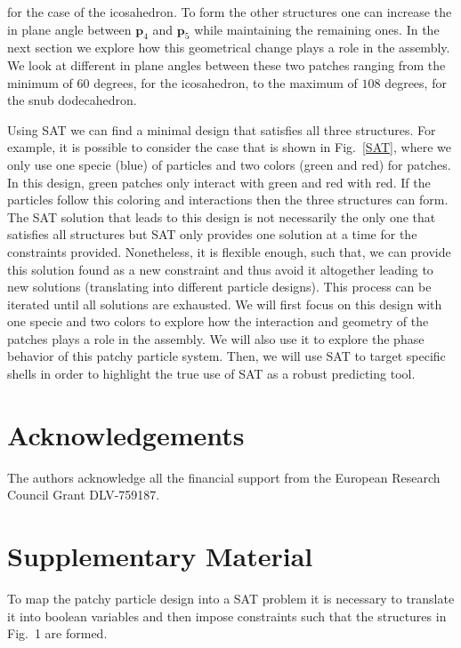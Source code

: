 \documentclass[a4paper, amsfonts, amssymb, amsmath, reprint, showkeys, nofootinbib, oneside]{revtex4-1}
\begin{document}
\noindent for the case of the icosahedron. To form the other structures one can increase the in plane angle between $\textbf{p}_4$ and $\textbf{p}_5$ while maintaining the remaining ones. In the next section we explore how this geometrical change plays a role in the assembly. We look at different in plane angles between these two patches ranging from the minimum of $60$ degrees, for the icosahedron, to the maximum of $108$ degrees, for the snub dodecahedron.

Using SAT we can find a minimal design that satisfies all three structures. For example, it is possible to consider the case that is shown in Fig.~\ref{SAT}, where we only use one specie (blue) of particles and two colors (green and red) for patches. In this design, green patches only interact with green and red with red. If the particles follow this coloring and interactions then the three structures can form. The SAT solution that leads to this design is not necessarily the only one that satisfies all structures but SAT only provides one solution at a time for the constraints provided. Nonetheless, it is flexible enough, such that, we can provide this solution found as a new constraint and thus avoid it altogether leading to new solutions (translating into different particle designs). This process can be iterated until all solutions are exhausted. We will first focus on this design with one specie and two colors to explore how the interaction and geometry of the patches plays a role in the assembly. We will also use it to explore the phase behavior of this patchy particle system. Then, we will use SAT to target specific shells in order to highlight the true use of SAT as a robust predicting tool.

\section{Acknowledgements}

The authors acknowledge all the financial support from the European Research Council Grant DLV-759187.



\section{Supplementary Material}

To map the patchy particle design into a SAT problem it is necessary to translate it into boolean variables and then impose constraints such that the structures in Fig.~1 are formed.
\end{document}
